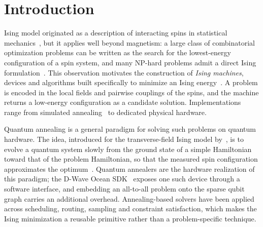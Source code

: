 \documentclass{ieeeaccess}
\begin{document}
\titlepgskip=-15pt

\maketitle

\section{Introduction}

 Ising model originated as a description of interacting
spins in statistical mechanics~\cite{Ising1925,mccoy2014two,SherringtonKirkpatrick1975}, but it
applies well beyond magnetism: a large class of combinatorial
optimization problems can be written as the search for the lowest-energy
configuration of a spin system, and many NP-hard problems admit a direct
Ising formulation~\cite{Lucas2014ising,barahona1982computational,kalinin2022computational}.
This observation motivates the
construction of \emph{Ising machines}, devices and algorithms built
specifically to minimize an Ising energy~\cite{Mohseni2022ising,gao2024photonic}. A problem
is encoded in the local fields and pairwise couplings of the spins, and the
machine returns a low-energy configuration as a candidate solution.
Implementations range from simulated annealing~\cite{Kirkpatrick1983sa}
to dedicated physical hardware.

Quantum annealing is a general paradigm for solving such problems on quantum
hardware. The idea, introduced for the transverse-field Ising model
by~\cite{KadowakiNishimori1998}, is to evolve a quantum system slowly from
the ground state of a simple Hamiltonian toward that of the problem
Hamiltonian, so that the measured spin configuration approximates the
optimum~\cite{farhi2000quantum,das2008colloquium,mcgeoch2022adiabatic}.
Quantum annealers are the hardware realization of this paradigm; the D-Wave
Ocean SDK~\cite{DWaveOcean} exposes one such device through
a software interface, and embedding an all-to-all problem onto the sparse
qubit graph carries an additional overhead. Annealing-based solvers have been
applied across scheduling, routing, sampling and constraint satisfaction,
which makes the Ising minimization a reusable primitive rather than a
problem-specific technique.
\end{document}
